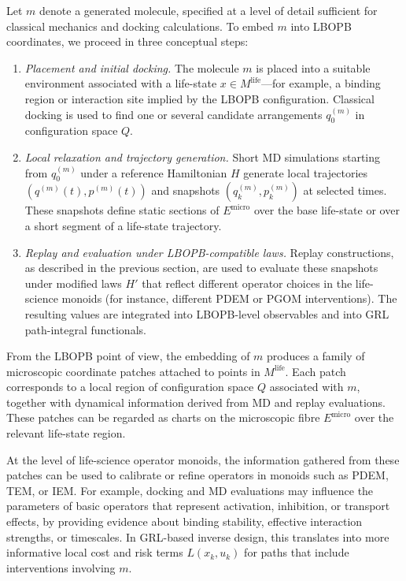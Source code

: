 \documentclass[11pt]{book}
\theoremstyle{plain}
\theoremstyle{definition}
\theoremstyle{remark}
\begin{document}
Let $m$ denote a generated molecule, specified at a level of detail
sufficient for classical mechanics and docking calculations. To embed
$m$ into LBOPB coordinates, we proceed in three conceptual steps:
\begin{enumerate}
  \item \emph{Placement and initial docking.}
        The molecule $m$ is placed into a suitable environment
        associated with a life-state $x \in M^{\mathrm{life}}$—for
        example, a binding region or interaction site implied by the
        LBOPB configuration. Classical docking is used to find one or
        several candidate arrangements $q^{(m)}_{0}$ in configuration
        space $Q$.
  \item \emph{Local relaxation and trajectory generation.}
        Short MD simulations starting from $q^{(m)}_{0}$ under a
        reference Hamiltonian $H$ generate local trajectories
        $(q^{(m)}(t),p^{(m)}(t))$ and snapshots
        $(q^{(m)}_{k},p^{(m)}_{k})$ at selected times. These snapshots
        define static sections of $E^{\mathrm{micro}}$ over the base
        life-state or over a short segment of a life-state trajectory.
  \item \emph{Replay and evaluation under LBOPB-compatible laws.}
        Replay constructions, as described in the previous section,
        are used to evaluate these snapshots under modified laws $H'$
        that reflect different operator choices in the life-science
        monoids (for instance, different PDEM or PGOM interventions).
        The resulting values are integrated into LBOPB-level
        observables and into GRL path-integral functionals.
\end{enumerate}

From the LBOPB point of view, the embedding of $m$ produces a family
of microscopic coordinate patches attached to points in
$M^{\mathrm{life}}$. Each patch corresponds to a local region of
configuration space $Q$ associated with $m$, together with dynamical
information derived from MD and replay evaluations. These patches can
be regarded as charts on the microscopic fibre $E^{\mathrm{micro}}$
over the relevant life-state region.

At the level of life-science operator monoids, the information gathered
from these patches can be used to calibrate or refine operators in
monoids such as PDEM, TEM, or IEM. For example, docking and MD
evaluations may influence the parameters of basic operators that
represent activation, inhibition, or transport effects, by providing
evidence about binding stability, effective interaction strengths, or
timescales. In GRL-based inverse design, this translates into more
informative local cost and risk terms $L(x_{k},u_{k})$ for paths that
include interventions involving $m$.
\end{document}
